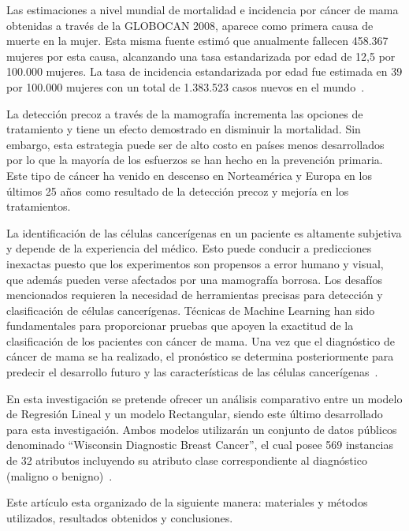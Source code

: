 \documentclass[conference]{IEEEtran}
\begin{document}
Las estimaciones a nivel mundial de mortalidad e incidencia por cáncer de mama obtenidas a través de la GLOBOCAN 2008, aparece como primera causa de muerte en la mujer. Esta misma fuente estimó que anualmente fallecen 458.367 mujeres por esta causa, alcanzando una tasa estandarizada por edad de 12,5 por 100.000 mujeres. La tasa de incidencia estandarizada por edad fue estimada en 39 por 100.000 mujeres con un total de 1.383.523 casos nuevos en el mundo~\cite{articule:Prieto2011}. \newline

La detección precoz a través de la mamografía incrementa las opciones  de tratamiento y tiene un efecto demostrado en disminuir la mortalidad. Sin embargo, esta estrategia puede ser de alto costo en países menos desarrollados por lo que la mayoría de los esfuerzos se han hecho en la prevención primaria. Este tipo de cáncer ha venido en descenso en Norteamérica y Europa en los últimos 25 años como resultado de la detección precoz y mejoría en los tratamientos. \newline

La identificación de las células cancerígenas en un paciente es altamente subjetiva y depende de la experiencia del médico. Esto puede conducir a predicciones inexactas puesto que los experimentos son propensos a error humano y visual, que además pueden verse afectados por una mamografía borrosa. Los desafíos mencionados requieren la necesidad de herramientas precisas para detección y clasificación de células cancerígenas. Técnicas de Machine Learning han sido fundamentales para proporcionar pruebas que apoyen la exactitud de la clasificación de los pacientes con cáncer de mama. Una vez que el diagnóstico de cáncer de mama se ha realizado, el pronóstico se determina posteriormente para predecir el desarrollo futuro y las características de las células cancerígenas~\cite{articule:YouRumbe2010}. \newline

En esta investigación se pretende ofrecer un análisis comparativo entre un modelo de Regresión Lineal y un modelo Rectangular, siendo este último desarrollado para esta investigación. Ambos modelos utilizarán un conjunto de datos públicos denominado ``Wisconsin Diagnostic Breast Cancer'', el cual posee 569 instancias de 32 atributos incluyendo su atributo clase correspondiente al diagnóstico (maligno o benigno)~\cite{resource:WDBC1995}. \newline

Este artículo esta organizado de la siguiente manera: materiales y métodos utilizados, resultados obtenidos y conclusiones.
\end{document}
